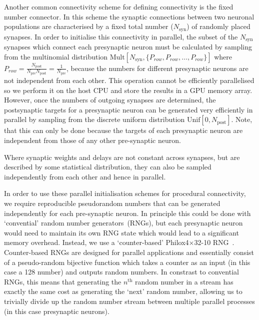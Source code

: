 \documentclass[9pt,twocolumn,twoside,lineno]{pnas-new}
\newcommand{\todo}[1]{\textbf{\textsc{\textcolor{red}{(TODO: #1)}}}}
\begin{document}
Another common connectivity scheme for defining connectivity is the fixed number connector.
In this scheme the synaptic connections between two neuronal populations are characterised by a fixed total number ($N_{\text{syn}}$) of randomly placed synapses.
In order to initialise this connectivity in parallel, the subset of the $N_{\text{syn}}$ synapses which connect each presynaptic neuron must be calculated by sampling from the multinomial distribution $\text{Mult}[N_{\text{syn}}, \{P_{row}, P_{row}, \ldots, P_{row}\}]$ where $P_{row} = \frac{N_{\text{post}}}{N_{\text{pre}} N_{\text{post}}} =  \frac{1}{N_{\text{pre}}} $, because the numbers for different presynaptic neurons are not independent from each other.
This operation cannot be efficiently parallelised so we perform it on the host CPU and store the results in a GPU memory array.
However, once the numbers of outgoing synapses are determined, the postsynaptic targets for a presynaptic neuron can be generated very efficiently in parallel by sampling from the discrete uniform distribution $\text{Unif}[0, N_{\text{post}}]$.
Note, that this can only be done because the targets of each presynaptic neuron are independent from those of any other pre-synaptic neuron.

Where synaptic weights and delays are not constant across synapses, but are described by some statistical distribution, they can also be sampled independently from each other and hence in parallel.
%

In order to use these parallel initialisation schemes for procedural connectivity, we require reproducible pseudorandom numbers that can be generated independently for each pre-synaptic neuron.
In principle this could be done with `convential' random number generators~(RNGs), but each presynaptic neuron would need to maintain its own RNG state which would lead to a significant memory overhead.
Instead, we use a `counter-based' Philox4$\times$32-10 RNG~\citep{Salmon2011}.
Counter-based RNGs are designed for parallel applications and essentially consist of a pseudo-random bijective function which takes a counter as an input (in this case a \SI{128}{\bit} number) and outputs random numbers.
In constrast to convential RNGs, this means that generating the $n^\text{th}$ random number in a stream has exactly the same cost as generating the `next' random number, allowing us to trivially divide up the random number stream between multiple parallel processes (in this case presynaptic neurons).
\end{document}
